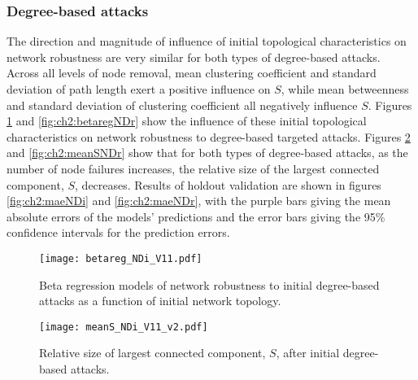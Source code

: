 \subsubsection{Degree-based attacks}
\label{sec:ch2:results:targeted:degree}

The direction and magnitude of influence of initial topological characteristics on network robustness are very similar for both types of degree-based attacks. Across all levels of node removal, mean clustering coefficient and standard deviation of path length exert a positive influence on $S$, while mean betweenness and standard deviation of clustering coefficient all negatively influence $S$.  Figures \ref{fig:ch2:betaregNDi} and \ref{fig:ch2:betaregNDr} show the influence of these initial topological characteristics on network robustness to degree-based targeted attacks.  Figures \ref{fig:ch2:meanSNDi} and \ref{fig:ch2:meanSNDr} show that for both types of degree-based attacks, as the number of node failures increases, the relative size of the largest connected component, $S$, decreases.  Results of holdout validation are shown in figures \ref{fig:ch2:maeNDi} and \ref{fig:ch2:maeNDr}, with the purple bars giving the mean absolute errors of the models' predictions and the error bars giving the 95\% confidence intervals for the prediction errors.


\begin{figure}[!htp]
\begin{center}
\texttt{[image: betareg\_NDi\_V11.pdf]}
\caption{\label{fig:ch2:betaregNDi}Beta regression models of network robustness to initial degree-based attacks as a function of initial network topology.}
\end{center}
\end{figure}



\begin{figure}[!htp]
\begin{center}
\texttt{[image: meanS\_NDi\_V11\_v2.pdf]}
\caption{\label{fig:ch2:meanSNDi}Relative size of largest connected component, $S$, after initial degree-based attacks.}
\end{center}
\end{figure}

